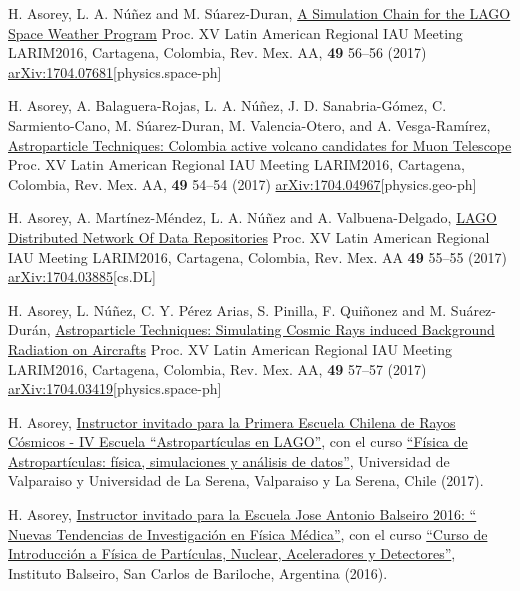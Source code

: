 \begin{etaremune}
\item {} H. Asorey, L. A. Núñez and M. Súarez-Duran, \href{http://www.astroscu.unam.mx/rmaa/RMxAC..49/PDF/RMxAC..49\_oral6.pdf}{{A Simulation Chain for the LAGO Space Weather Program}} \en Proc.
XV Latin American Regional IAU Meeting LARIM2016, Cartagena, Colombia, Rev.
Mex.
AA, {\textbf{49}} 56--56 (2017) \href{http://arxiv.org/abs/1704.07681}{arXiv:1704.07681}[physics.space-ph]

\item {} H. Asorey, A. Balaguera-Rojas, L. A. Núñez, J. D. Sanabria-Gómez, C. Sarmiento-Cano, M. Súarez-Duran, M. Valencia-Otero, and A. Vesga-Ramírez, \href{http://www.astroscu.unam.mx/rmaa/RMxAC..49/PDF/RMxAC..49\_oral4.pdf}{{Astroparticle Techniques: Colombia active volcano candidates for Muon Telescope}} \en Proc.
XV Latin American Regional IAU Meeting LARIM2016, Cartagena, Colombia, Rev.
Mex.
AA, {\textbf{49}} 54--54 (2017) \href{http://arxiv.org/abs/1704.04967}{arXiv:1704.04967}[physics.geo-ph]

\item {}H. Asorey, A. Martínez-Méndez, L. A. Núñez and A. Valbuena-Delgado, \href{http://www.astroscu.unam.mx/rmaa/RMxAC..49/PDF/RMxAC..49\_oral5.pdf}{{LAGO Distributed Network Of Data Repositories}} \en Proc.
XV Latin American Regional IAU Meeting LARIM2016, Cartagena, Colombia, Rev.
Mex.
AA {\textbf{49}} 55--55 (2017) \href{http://arxiv.org/abs/1704.03885}{arXiv:1704.03885}[cs.DL]

\item {}H. Asorey, L. Núñez, C. Y. Pérez Arias, S. Pinilla, F. Quiñonez and M. Suárez-Durán, \href{http://www.astroscu.unam.mx/rmaa/RMxAC..49/PDF/RMxAC..49\_oral7.pdf}{{Astroparticle Techniques: Simulating Cosmic Rays induced Background Radiation on Aircrafts}} \en Proc.
XV Latin American Regional IAU Meeting LARIM2016, Cartagena, Colombia, Rev.
Mex.
AA, {\textbf{49}} 57--57 (2017) \href{http://arxiv.org/abs/1704.03419}{arXiv:1704.03419}[physics.space-ph]

\item {} H. Asorey, \href{http://ifa.uv.cl/rayoscosmicos/}{{Instructor invitado para la Primera Escuela Chilena de Rayos Cósmicos - IV Escuela ``Astropartículas en LAGO''}}, con el curso \href{https://github.com/lagoproject/astroparticulas}{{``Física de Astropartículas: física, simulaciones y análisis de datos''}}, Universidad de Valparaiso y Universidad de La Serena, Valparaiso y La Serena, Chile (2017).

\item {} H. Asorey, \href{https://fisica.cab.cnea.gov.ar/jab2016/}{{Instructor invitado para la Escuela Jose Antonio Balseiro 2016: `` Nuevas Tendencias de Investigación en Física Médica''}}, con el curso \href{ https://github.com/asoreyh/intro-nuclear-fisica-medica }{{``Curso de Introducción a Física de Partículas, Nuclear, Aceleradores y Detectores''}}, Instituto Balseiro, San Carlos de Bariloche, Argentina (2016).


\end{etaremune}
